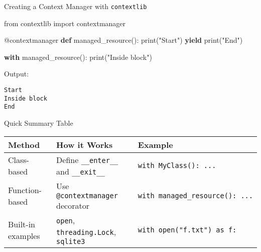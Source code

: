 \documentclass[
  letterpaper,
  DIV=11,
  numbers=noendperiod]{scrreprt}
\newenvironment{Shaded}{\begin{snugshade}}{\end{snugshade}}
\newcommand{\AttributeTok}[1]{\textcolor[rgb]{0.40,0.45,0.13}{#1}}
\newcommand{\BuiltInTok}[1]{\textcolor[rgb]{0.00,0.23,0.31}{#1}}
\newcommand{\ControlFlowTok}[1]{\textcolor[rgb]{0.00,0.23,0.31}{\textbf{#1}}}
\newcommand{\ImportTok}[1]{\textcolor[rgb]{0.00,0.46,0.62}{#1}}
\newcommand{\KeywordTok}[1]{\textcolor[rgb]{0.00,0.23,0.31}{\textbf{#1}}}
\newcommand{\NormalTok}[1]{\textcolor[rgb]{0.00,0.23,0.31}{#1}}
\newcommand{\StringTok}[1]{\textcolor[rgb]{0.13,0.47,0.30}{#1}}
\begin{document}
Creating a Context Manager with \texttt{contextlib}

\begin{Shaded}
\begin{Highlighting}[]
\ImportTok{from}\NormalTok{ contextlib }\ImportTok{import}\NormalTok{ contextmanager}

\AttributeTok{@contextmanager}
\KeywordTok{def}\NormalTok{ managed\_resource():}
    \BuiltInTok{print}\NormalTok{(}\StringTok{"Start"}\NormalTok{)}
    \ControlFlowTok{yield}
    \BuiltInTok{print}\NormalTok{(}\StringTok{"End"}\NormalTok{)}

\ControlFlowTok{with}\NormalTok{ managed\_resource():}
    \BuiltInTok{print}\NormalTok{(}\StringTok{"Inside block"}\NormalTok{)}
\end{Highlighting}
\end{Shaded}

Output:

\begin{verbatim}
Start
Inside block
End
\end{verbatim}

Quick Summary Table

\begin{longtable}[]{@{}
  >{\raggedright\arraybackslash}p{}
  >{\raggedright\arraybackslash}p{}
  >{\raggedright\arraybackslash}p{}@{}}
\toprule\noalign{}
\begin{minipage}[b]{\linewidth}\raggedright
Method
\end{minipage} & \begin{minipage}[b]{\linewidth}\raggedright
How it Works
\end{minipage} & \begin{minipage}[b]{\linewidth}\raggedright
Example
\end{minipage} \\
\midrule\noalign{}
\endhead
\bottomrule\noalign{}
\endlastfoot
Class-based & Define \texttt{\_\_enter\_\_} and \texttt{\_\_exit\_\_} &
\texttt{with\ MyClass():\ ...} \\
Function-based & Use \texttt{@contextmanager} decorator &
\texttt{with\ managed\_resource():\ ...} \\
Built-in examples & \texttt{open}, \texttt{threading.Lock},
\texttt{sqlite3} & \texttt{with\ open("f.txt")\ as\ f:} \\
\end{longtable}
\end{document}
